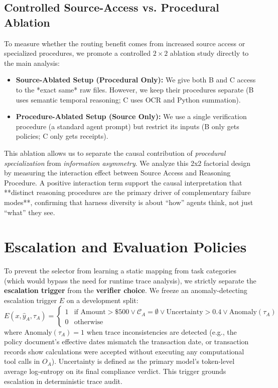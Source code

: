 \documentclass[manuscript,screen,nonacm]{acmart}
\begin{document}
\subsection{Controlled Source-Access vs. Procedural Ablation}
To measure whether the routing benefit comes from increased source access or specialized procedures, we promote a controlled $2\times2$ ablation study directly to the main analysis:
\begin{itemize}
    \item \textbf{Source-Ablated Setup (Procedural Only):} We give both B and C access to the *exact same* raw files. However, we keep their procedures separate (B uses semantic temporal reasoning; C uses OCR and Python summation).
    \item \textbf{Procedure-Ablated Setup (Source Only):} We use a single verification procedure (a standard agent prompt) but restrict its inputs (B only gets policies; C only gets receipts).
\end{itemize}
This ablation allows us to separate the causal contribution of \emph{procedural specialization} from \emph{information asymmetry}. We analyze this 2x2 factorial design by measuring the interaction effect between Source Access and Reasoning Procedure. A positive interaction term support the causal interpretation that **distinct reasoning procedures are the primary driver of complementary failure modes**, confirming that harness diversity is about ``how'' agents think, not just ``what'' they see.

\section{Escalation and Evaluation Policies}
\label{sec:policies}

To prevent the selector from learning a static mapping from task categories (which would bypass the need for runtime trace analysis), we strictly separate the \textbf{escalation trigger} from the \textbf{verifier choice}. We freeze an anomaly-detecting escalation trigger $E$ on a development split:
\begin{equation}
    E(x, \hat{y}_A, \tau_A) = 
    \begin{cases}
        1 & \text{if } \text{Amount} > \$500 \lor \mathcal{C}_A = \emptyset \lor \text{Uncertainty} > 0.4 \lor \text{Anomaly}(\tau_A) \\
        0 & \text{otherwise}
    \end{cases}
\end{equation}
where $\text{Anomaly}(\tau_A) = 1$ when trace inconsistencies are detected (e.g., the policy document's effective dates mismatch the transaction date, or transaction records show calculations were accepted without executing any computational tool calls in $O_A$). Uncertainty is defined as the primary model's token-level average log-entropy on its final compliance verdict. This trigger grounds escalation in deterministic trace audit.
\end{document}
